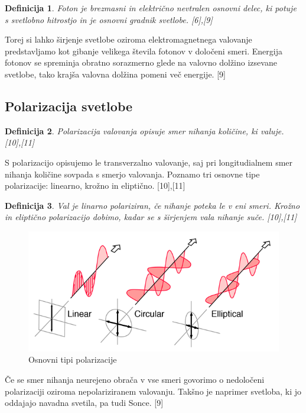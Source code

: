 \documentclass[A4paper, 11pt]{article}
\newtheorem{definicija}{Definicija}
\begin{document}
\begin{definicija}
Foton je brezmasni in električno nevtralen osnovni delec, ki potuje s svetlobno hitrostjo in je osnovni gradnik svetlobe. [6],[9]
\end{definicija} 

Torej si lahko širjenje svetlobe oziroma elektromagnetnega valovanje predstavljamo kot gibanje velikega števila fotonov v določeni smeri. Energija fotonov se spreminja obratno sorazmerno glede na valovno dolžino izsevane svetlobe, tako krajša valovna dolžina pomeni več energije. [9]

\subsection{Polarizacija svetlobe}

\begin{definicija}
Polarizacija valovanja opisuje smer nihanja količine, ki valuje. [10],[11]
\end{definicija}


S polarizacijo opisujemo le transverzalno valovanje, saj pri longitudialnem smer nihanja količine sovpada s smerjo valovanja. Poznamo tri osnovne tipe polarizacije: linearno, krožno in eliptično. [10],[11]

\begin{definicija}
Val je linarno polariziran, če nihanje poteka le v eni smeri. Krožno in eliptično polarizacijo dobimo, kadar se s širjenjem vala nihanje suče. [10],[11]
\end{definicija}

\begin{figure}[h]
\centering
\caption{Osnovni tipi polarizacije}
\includegraphics[scale=2]{polcls}
\end{figure}

Če se smer nihanja neurejeno obrača v vse smeri govorimo o nedoločeni polarizaciji oziroma nepolariziranem valovanju. Takšno je naprimer svetloba, ki jo oddajajo navadna svetila, pa tudi Sonce. [9]
\end{document}
